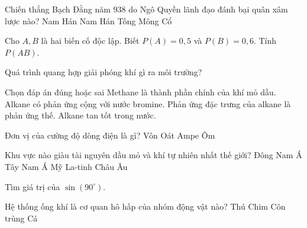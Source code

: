 \begin{ex}
    Chiến thắng Bạch Đằng năm 938 do Ngô Quyền lãnh đạo đánh bại quân xâm lược nào?
    \choice
    {Nam Hán}
    {\True Nam Hán}
    {Tống}
    {Mông Cổ}
\end{ex}
\begin{ex}
    Cho $A, B$ là hai biến cố độc lập. Biết $P(A)=0,5$ và $P(B)=0,6$. Tính $P(AB)$.
\end{ex}
\begin{ex}
    Quá trình quang hợp giải phóng khí gì ra môi trường?
\end{ex}
\begin{ex}
    Chọn đáp án đúng hoặc sai
    \choiceTF
    {\True Methane là thành phần chính của khí mỏ dầu.}
    {Alkane có phản ứng cộng với nước bromine.}
    {\True Phản ứng đặc trưng của alkane là phản ứng thế.}
    {Alkane tan tốt trong nước.}
\end{ex}
\begin{ex}
    Đơn vị của cường độ dòng điện là gì?
    \choice
    {Vôn}
    {Oát}
    {\True Ampe}
    {Ôm}
\end{ex}
\begin{ex}
    Khu vực nào giàu tài nguyên dầu mỏ và khí tự nhiên nhất thế giới?
    \choice
    {Đông Nam Á}
    {\True Tây Nam Á}
    {Mỹ La-tinh}
    {Châu Âu}
\end{ex}
\begin{ex}
    Tìm giá trị của $\sin(90^\circ)$.
\end{ex}
\begin{ex}
    Hệ thống ống khí là cơ quan hô hấp của nhóm động vật nào?
    \choice
    {Thú}
    {Chim}
    {\True Côn trùng}
    {Cá}
\end{ex}
